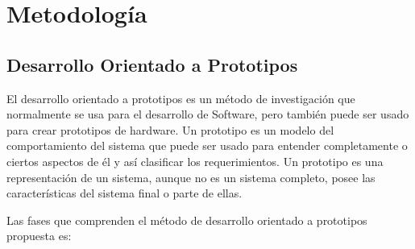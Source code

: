 
\chapter{Metodolog\'{i}a} %



\ifpdf
    \graphicspath{{3/figures/PNG/}{3/figures/PDF/}{3/figures/}}
\else
    \graphicspath{{3/figures/EPS/}{3/figures/}}
\fi


\section{Desarrollo Orientado a Prototipos}

El desarrollo orientado a prototipos es un m\'{e}todo de investigaci\'{o}n que normalmente se usa para el desarrollo de Software, pero tambi\'{e}n puede ser usado para crear prototipos de hardware. Un prototipo es un modelo del comportamiento del sistema que puede ser usado para entender completamente o ciertos aspectos de \'{e}l y as\'{i} clasificar los requerimientos. Un prototipo es una representaci\'{o}n de un sistema, aunque no es un sistema completo, posee las caracter\'{i}sticas del sistema final o parte de ellas.

Las fases que comprenden el m\'{e}todo de desarrollo orientado a prototipos propuesta es:























